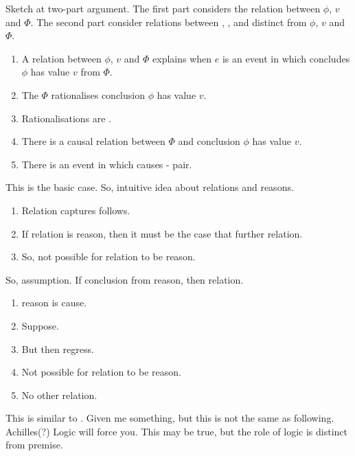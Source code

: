\begin{note}
  Sketch at two-part argument.
  The first part considers the relation between \(\phi\), \(v\) and \(\Phi\).
  The second part consider relations between , , and  distinct from \(\phi\), \(v\) and \(\Phi\).

  \begin{enumerate}
  \item
    A relation between \(\phi\), \(v\) and \(\Phi\) explains when \(e\) is an event in which \vAgent{} concludes \(\phi\) has value \(v\) from \(\Phi\).
  \item
    The \pool{} \(\Phi\) rationalises  conclusion \(\phi\) has value \(v\).
  \item
    Rationalisations are \cExpl{}.
  \item
    There is a causal relation between \(\Phi\) and  conclusion \(\phi\) has value \(v\).
  \item
    There is an event in which \pool{} causes - pair.
  \end{enumerate}

  This is the basic case.
  So, intuitive idea about relations and reasons.

  \begin{enumerate}
  \item
    Relation captures follows.
  \item
    If relation is reason, then it must be the case that further relation.
  \item
    So, not possible for relation to be \agents{} reason.
  \end{enumerate}

  So, assumption.
  If conclusion from reason, then relation.

  \begin{enumerate}
  \item
     reason is cause.
  \item
    Suppose.
  \item
    But then regress.
  \item
    Not possible for relation to be reason.
  \item
    No other relation.
  \end{enumerate}

  This is similar to \citeauthor{Carroll:1895uj}.
  Given me something, but this is not the same as following.
  Achilles(?) Logic will force you.
  This may be true, but the role of logic is distinct from premise.


\end{note}
